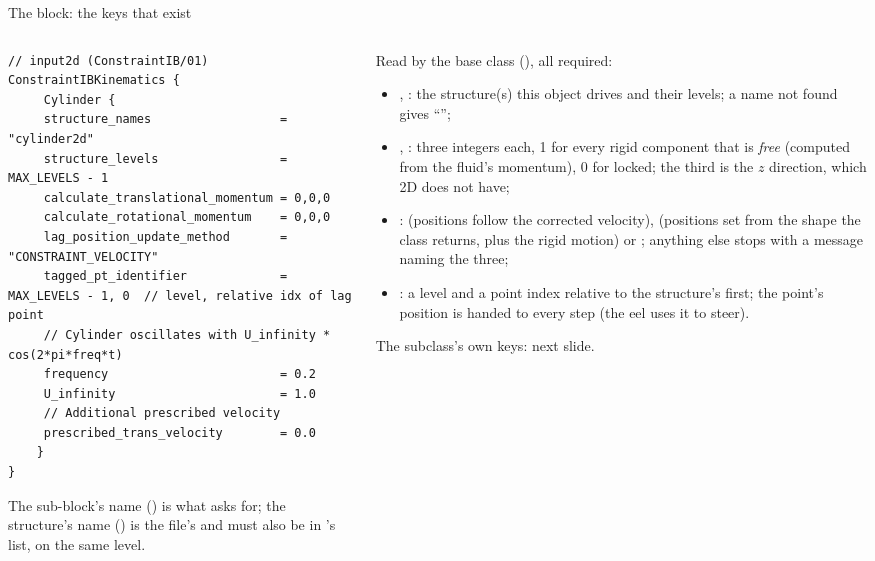 \documentclass[aspectratio=169,11pt]{beamer}
\begin{document}
\begin{frame}[fragile]{The  block: the keys that exist}
\label{fr:keys}
\begin{columns}[T,onlytextwidth]
\begin{column}{0.46\textwidth}
\begin{lstlisting}[style=inputtiny]
// input2d (ConstraintIB/01)
ConstraintIBKinematics {
     Cylinder {
     structure_names                  = "cylinder2d"
     structure_levels                 = MAX_LEVELS - 1
     calculate_translational_momentum = 0,0,0
     calculate_rotational_momentum    = 0,0,0
     lag_position_update_method       = "CONSTRAINT_VELOCITY"
     tagged_pt_identifier             = MAX_LEVELS - 1, 0  // level, relative idx of lag point
     // Cylinder oscillates with U_infinity * cos(2*pi*freq*t)
     frequency                        = 0.2
     U_infinity                       = 1.0
     // Additional prescribed velocity
     prescribed_trans_velocity        = 0.0
    }
}
\end{lstlisting}
\scriptsize The sub-block's name () is what  asks for; the structure's name () is the  file's and must also be in 's list, on the same level.
\end{column}
\begin{column}{0.52\textwidth}
\scriptsize Read by the base class (), all required:
\begin{itemize}
  \item {}, : the structure(s) this object drives and their levels; a name not found gives ``'';
  \item {}, : three integers each, 1 for every rigid component that is \emph{free} (computed from the fluid's momentum), 0 for locked; the third is the $z$ direction, which 2D does not have;
  \item {}:  (positions follow the corrected velocity),  (positions set from the shape the class returns, plus the rigid motion) or ; anything else stops with a message naming the three;
  \item {}: a level and a point index relative to the structure's first; the point's position is handed to  every step (the eel uses it to steer).
\end{itemize}
The subclass's own keys: next slide.
\end{column}
\end{columns}
\end{frame}
\end{document}

